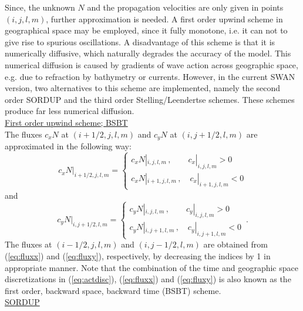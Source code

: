 \documentclass[12pt]{book}
\begin{document}
Since, the unknown $N$ and the propagation velocities are only given in points $(i,j,l,m)$,
further approximation is needed. A first order upwind scheme
in geographical space may be employed, since it fully
monotone, i.e. it can not to give rise to spurious oscillations.
A disadvantage of this scheme is that it is numerically
diffusive, which naturally degrades the accuracy of the model.
This numerical diffusion is caused by gradients of wave action across geographic space, e.g. due to refraction by bathymetry or currents.
However, in
the current SWAN version, two alternatives to this scheme are implemented, namely the second
order SORDUP and the third order Stelling/Leendertse schemes. These schemes produce far less numerical diffusion.
\\[2ex]
\noindent
\underline {First order upwind scheme; BSBT}
\\[2ex]
\noindent
The fluxes $c_x N$ at $(i+1/2,j,l,m)$ and $c_y N$ at $(i,j+1/2,l,m)$ are approximated in the
following way:
\begin{equation}
  c_x N|_{i+1/2,j,l,m} = \left\{
                           \begin{array}{l}
                              c_x N|_{i,j,l,m}\,, \qquad c_x|_{i,j,l,m} > 0 \\
                              c_x N|_{i+1,j,l,m}\,, \quad c_x|_{i+1,j,l,m} < 0
                           \end{array}
                         \right.
  \label{eq:fluxx}
\end{equation}
and
\begin{equation}
  c_y N|_{i,j+1/2,l,m} = \left\{
                           \begin{array}{l}
                              c_y N|_{i,j,l,m}\,, \qquad c_y|_{i,j,l,m} > 0 \\
                              c_y N|_{i,j+1,l,m}\,, \quad c_y|_{i,j+1,l,m} < 0
                           \end{array}
                         \right.\, .
  \label{eq:fluxy}
\end{equation}
The fluxes at $(i-1/2,j,l,m)$ and $(i,j-1/2,l,m)$ are obtained from (\ref{eq:fluxx}) and (\ref{eq:fluxy}),
respectively, by decreasing the indices by 1 in appropriate manner. Note that the combination of the time
and geographic space discretizations in (\ref{eq:actdisc}), (\ref{eq:fluxx}) and (\ref{eq:fluxy}) is also
known as the first order, backward space, backward time (BSBT) scheme.
\\[2ex]
\noindent
\underline {SORDUP}
\end{document}
